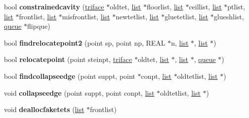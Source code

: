\begin{DoxyCompactItemize}
\item 
\hypertarget{classtetgenmesh_a8be680ba065c4eee2ebb3bc232b0337f}{bool {\bfseries constrainedcavity} (\hyperlink{classtetgenmesh_1_1triface}{triface} $\ast$oldtet, \hyperlink{classtetgenmesh_1_1list}{list} $\ast$floorlist, \hyperlink{classtetgenmesh_1_1list}{list} $\ast$ceillist, \hyperlink{classtetgenmesh_1_1list}{list} $\ast$ptlist, \hyperlink{classtetgenmesh_1_1list}{list} $\ast$frontlist, \hyperlink{classtetgenmesh_1_1list}{list} $\ast$misfrontlist, \hyperlink{classtetgenmesh_1_1list}{list} $\ast$newtetlist, \hyperlink{classtetgenmesh_1_1list}{list} $\ast$gluetetlist, \hyperlink{classtetgenmesh_1_1list}{list} $\ast$glueshlist, \hyperlink{classtetgenmesh_1_1queue}{queue} $\ast$flipque)}\label{classtetgenmesh_a8be680ba065c4eee2ebb3bc232b0337f}

\item 
\hypertarget{classtetgenmesh_a2c7ec3b5d23d5c7a333587f5819f40ec}{bool {\bfseries findrelocatepoint2} (point sp, point np, R\-E\-A\-L $\ast$n, \hyperlink{classtetgenmesh_1_1list}{list} $\ast$, \hyperlink{classtetgenmesh_1_1list}{list} $\ast$)}\label{classtetgenmesh_a2c7ec3b5d23d5c7a333587f5819f40ec}

\item 
\hypertarget{classtetgenmesh_a3716786a764f853f8bc70e8f3e5401cd}{bool {\bfseries relocatepoint} (point steinpt, \hyperlink{classtetgenmesh_1_1triface}{triface} $\ast$oldtet, \hyperlink{classtetgenmesh_1_1list}{list} $\ast$, \hyperlink{classtetgenmesh_1_1list}{list} $\ast$, \hyperlink{classtetgenmesh_1_1queue}{queue} $\ast$)}\label{classtetgenmesh_a3716786a764f853f8bc70e8f3e5401cd}

\item 
\hypertarget{classtetgenmesh_ac1d8bbe45ea8c9f7648602dcaf98806e}{bool {\bfseries findcollapseedge} (point suppt, point $\ast$conpt, \hyperlink{classtetgenmesh_1_1list}{list} $\ast$oldtetlist, \hyperlink{classtetgenmesh_1_1list}{list} $\ast$)}\label{classtetgenmesh_ac1d8bbe45ea8c9f7648602dcaf98806e}

\item 
\hypertarget{classtetgenmesh_a424b7951af016bb873850c0f7ad7d4a1}{void {\bfseries collapseedge} (point suppt, point conpt, \hyperlink{classtetgenmesh_1_1list}{list} $\ast$oldtetlist, \hyperlink{classtetgenmesh_1_1list}{list} $\ast$)}\label{classtetgenmesh_a424b7951af016bb873850c0f7ad7d4a1}

\item 
\hypertarget{classtetgenmesh_abb20127863ad5bfbd4139a77cf4a924d}{void {\bfseries deallocfaketets} (\hyperlink{classtetgenmesh_1_1list}{list} $\ast$frontlist)}\label{classtetgenmesh_abb20127863ad5bfbd4139a77cf4a924d}


\end{DoxyCompactItemize}

